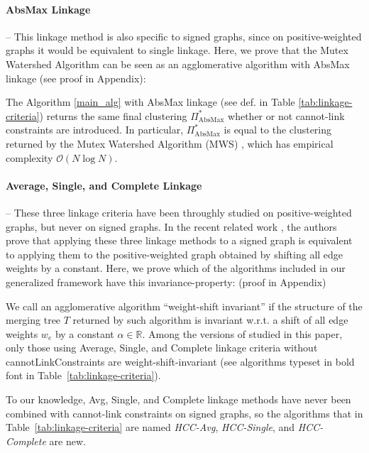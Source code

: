 \paragraph{AbsMax Linkage} -- This linkage method is also specific to signed graphs, since on positive-weighted graphs it would be equivalent to single linkage. Here, we prove that the Mutex Watershed Algorithm \cite{wolf2018mutex} can be seen as an agglomerative algorithm with AbsMax linkage (see proof in Appendix):
\begin{prop} 
The \algname{} Algorithm \ref{main_alg} with AbsMax linkage (see def. in Table \ref{tab:linkage-criteria}) returns the same final clustering $\Pi^*_{\mathrm{AbsMax}}$ whether or not cannot-link constraints are introduced. In particular, $\Pi^*_{\mathrm{AbsMax}}$ is equal to the clustering returned by the Mutex Watershed Algorithm (MWS) \cite{wolf2018mutex}, which has empirical complexity $\mathcal{O}(N \log N)$. 
\end{prop}


\paragraph{Average, Single, and Complete Linkage} -- These three linkage criteria have been throughly studied on positive-weighted graphs, but never on signed graphs. In the recent related work \cite{chehreghani2020hierarchical}, the authors prove that applying these three linkage methods to a signed graph is equivalent to applying them to the positive-weighted graph obtained by shifting all edge weights by a constant.  Here, we prove which of the algorithms included in our generalized framework have this invariance-property: (proof in Appendix)
\begin{prop} \label{prop:weight_shift_invariant}
We call an agglomerative algorithm ``weight-shift invariant'' if the structure of the merging tree $T$ returned by such algorithm is invariant w.r.t. a shift of all edge weights $w_e$  by a constant $\alpha\in \mathbb{R}$. Among the versions of \algname{} studied in this paper, only those using Average, Single, and Complete linkage criteria without cannotLinkConstraints are weight-shift-invariant (see algorithms typeset in bold font in Table~\ref{tab:linkage-criteria}).
\end{prop}
\noindent To our knowledge, Avg, Single, and Complete linkage methods have never been combined with cannot-link constraints on signed graphs, so the algorithms that in Table~\ref{tab:linkage-criteria} are named \emph{HCC-Avg}, \emph{HCC-Single}, and \emph{HCC-Complete} are new.



